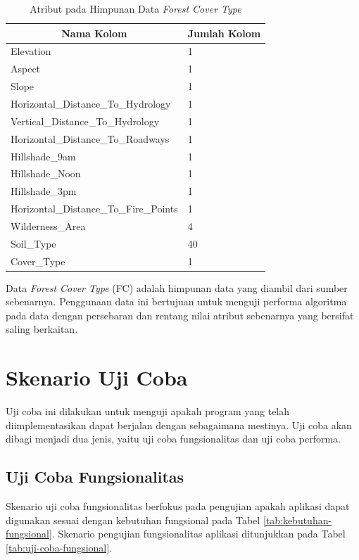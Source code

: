 \begin{table}[H]
	\centering
	\begin{tabular}{ | p{6cm} | p{1cm} | }
		\hline
		\multicolumn{1}{|c}{\textbf{Nama Kolom}} & \multicolumn{1}{|c|}{\textbf{Jumlah Kolom}} \\ \hline \hline
		Elevation & 1 \\ \hline
		Aspect & 1 \\ \hline
		Slope & 1  \\ \hline
		Horizontal\_Distance\_To\_Hydrology & 1 \\ \hline 
		Vertical\_Distance\_To\_Hydrology & 1 \\ \hline 
		Horizontal\_Distance\_To\_Roadways & 1 \\ \hline
		Hillshade\_9am & 1 \\ \hline
		Hillshade\_Noon & 1 \\ \hline
		Hillshade\_3pm & 1 \\ \hline
		Horizontal\_Distance\_To\_Fire\_Points & 1 \\ \hline
		Wilderness\_Area & 4 \\ \hline
		Soil\_Type & 40 \\ \hline
		Cover\_Type & 1 \\ \hline
	\end{tabular} \caption{Atribut pada Himpunan Data \textit{Forest Cover Type}}
	\label{tab:atribut-fc}
\end{table}

Data \textit{Forest Cover Type} (FC) adalah himpunan data yang
diambil dari sumber sebenarnya. Penggunaan data ini bertujuan
untuk menguji performa algoritma pada data dengan persebaran
dan rentang nilai atribut sebenarnya yang bersifat saling berkaitan.

\pagebreak
\section{Skenario Uji Coba} \label{skenarioujicoba}
\tab Uji coba ini dilakukan untuk menguji apakah program yang telah diimplementasikan dapat berjalan dengan sebagaimana mestinya. Uji coba akan dibagi menjadi dua jenis, yaitu uji coba fungsionalitas dan uji coba performa.

\subsection{Uji Coba Fungsionalitas}
\tab Skenario uji coba fungsionalitas berfokus pada pengujian apakah aplikasi dapat digunakan sesuai dengan kebutuhan fungsional pada Tabel \ref{tab:kebutuhan-fungsional}. Skenario pengujian fungsionalitas aplikasi ditunjukkan pada Tabel \ref{tab:uji-coba-fungsional}.

